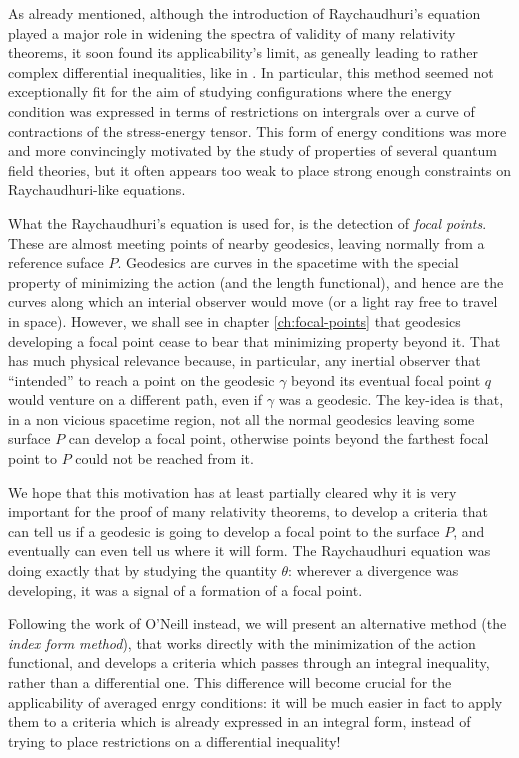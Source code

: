 As already mentioned, although the introduction of Raychaudhuri's equation played a major role in widening the spectra of validity of many relativity theorems, it soon found its applicability's limit, as geneally leading to rather complex differential inequalities, like in \cite[]{fewster2011singularity}.
In particular, this method seemed not exceptionally fit for the aim of studying configurations where the energy condition was expressed in terms of restrictions on intergrals over a curve of contractions of the stress-energy tensor. This form of energy conditions was more and more convincingly motivated by the study of properties of several quantum field theories, but it often appears too weak to place strong enough constraints on Raychaudhuri-like equations.

What the Raychaudhuri's equation is used for, is the detection of \emph{focal points}. These are almost meeting points of nearby geodesics, leaving normally from a reference suface \(P\). Geodesics are curves in the spacetime with the special property of minimizing the action (and the length functional), and hence are the curves along which an interial observer would move (or a light ray free to travel in space). However, we shall see in chapter \ref{ch:focal-points} that geodesics developing a focal point cease to bear that minimizing property beyond it. 
That has much physical relevance because, in particular, any inertial observer that ``intended'' to reach a point on the geodesic \(\gamma\) beyond its eventual focal point \(q\) would venture on a different path, even if \(\gamma\) was a geodesic.
The key-idea is that, in a non vicious spacetime region, not all the normal geodesics leaving some surface \(P\) can develop a focal point, otherwise points beyond the farthest focal point to \(P\) could not be reached from it. 

We hope that this motivation has at least partially cleared why it is very important for the proof of many relativity theorems, to develop a criteria that can tell us if a geodesic is going to develop a focal point to the surface \(P\), and eventually can even tell us where it will form. The Raychaudhuri equation was doing exactly that by studying the quantity \(\theta\): wherever a divergence was developing, it was a signal of a formation of a focal point.

Following the work of O'Neill instead, we will present an alternative method (the \emph{index form method}), that works directly with the minimization of the action functional, and develops a criteria which passes through an integral inequality, rather than a differential one. This difference will become crucial for the applicability of averaged enrgy conditions: it will be much easier in fact to apply them to a criteria which is already expressed in an integral form, instead of trying to place restrictions on a differential inequality!

